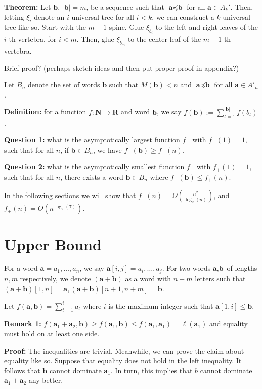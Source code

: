 \documentclass{article}
\begin{document}
\textbf{Theorem:} Let $\textbf{b}$, $|\textbf{b}|=m$, be a sequence such that $\textbf{a}\preceq \textbf{b}$ for all $\textbf{a} \in A_k'$. Then, letting $\xi_i$ denote an $i$-universal tree for all $i<k$, we can construct a $k$-universal tree like so. Start with the $m-1$-spine. Glue $\xi_{b_i}$ to the left and right leaves of the $i$-th vertebra, for $i < m$. Then, glue $\xi_{b_m}$ to the center leaf of the $m-1$-th vertebra.


Brief proof? (perhaps sketch ideas and then put proper proof in appendix?)


Let $B_n$ denote the set of words $\textbf{b}$ such that $M(\textbf{b})<n$ and $\textbf{a}\preceq \textbf{b}$ for all $\textbf{a} \in A'_n$.


\textbf{Definition:} for a function $f: \textbf{N}\to \textbf{R}$ and word $\textbf{b}$, we say $f(\textbf{b}):= \sum_{t=1}^{|\textbf{b}|} f(b_t)$.

\textbf{Question 1:} what is the asymptotically largest function $f_-$ with $f_-(1) =1$, such that for all $n$, if $\textbf{b}\in B_n$, we have $f_-(\textbf{b}) \ge  f_-(n)$.

\textbf{Question 2:} what is the asymptotically smallest function $f_+$ with $f_+(1) = 1$, such that for all $n$, there exists a word $\textbf{b}\in B_n$ where $f_+(\textbf{b}) \le  f_+(n)$.

In the following sections we will show that $f_-(n) = \Omega\left(\frac{n^2}{\log_2(n)}\right)$, and $f_+(n) = O(n^{\log_2(7)})$.


\section{Upper Bound}

For a word $\textbf{a} = a_1,\dots ,a_n$, we say $\textbf{a}[i,j] = a_i,\dots, a_j$. For two words $\textbf{a},\textbf{b}$ of lengths $n,m$ respectively, we denote $(\textbf{a}+\textbf{b})$ as a word with $n+m$ letters such that $(\textbf{a}+\textbf{b})[1,n] = \textbf{a}, (\textbf{a}+\textbf{b})[n+1,n+m] = \textbf{b}$.

Let $f(\textbf{a},\textbf{b}) = \sum_{t=1}^i a_t$ where $i$ is the maximum integer such that $\textbf{a}[1,i] \le \textbf{b}$.

\textbf{Remark 1:} $f(\textbf{a}_1+\textbf{a}_2,\textbf{b}) \ge f(\textbf{a}_1,\textbf{b})\le f(\textbf{a}_1,\textbf{a}_1) = \ell(\textbf{a}_1)$ and equality must hold on at least one side.

\textbf{Proof:} The inequalities are trivial. Meanwhile, we can prove the claim about equality like so. Suppose that equality does not hold in the left inequality. It follows that $\textbf{b}$ cannot dominate $\textbf{a}_1$. In turn, this implies that $b$ cannot dominate $\textbf{a}_1 +\textbf{a}_2$ any better. 
\end{document}
